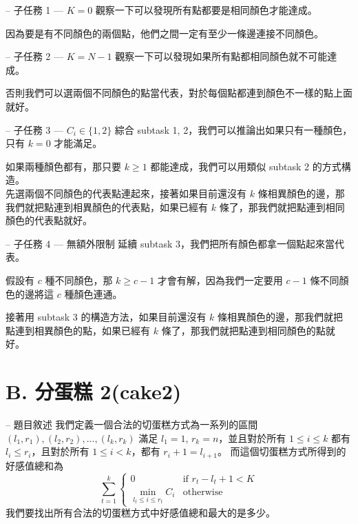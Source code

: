 \documentclass[hyperref,UTF8,notheorems,xcolor={dvipsnames}]{beamer}
\newcommand{\btitle}[1]{{\secname} -- #1}
\theoremstyle{definition}
\begin{document}
\begin{frame}[fragile]{\btitle{子任務 1 --- $K = 0$}}
	觀察一下可以發現所有點都要是相同顏色才能達成。 
	\pause

	因為要是有不同顏色的兩個點，他們之間一定有至少一條邊連接不同顏色。
\end{frame}

\begin{frame}[fragile]{\btitle{子任務 2 --- $K = N - 1$}}
	觀察一下可以發現如果所有點都相同顏色就不可能達成。 
	\pause

	否則我們可以選兩個不同顏色的點當代表，對於每個點都連到顏色不一樣的點上面就好。
\end{frame}

\begin{frame}[fragile]{\btitle{子任務 3 --- $C_i \in \{1, 2\}$}}
	綜合 subtask 1, 2，我們可以推論出如果只有一種顏色，只有 $k = 0$ 才能滿足。

	如果兩種顏色都有，那只要 $k \ge 1$ 都能達成，我們可以用類似 subtask 2 的方式構造。 \\
	先選兩個不同顏色的代表點連起來，接著如果目前還沒有 $k$ 條相異顏色的邊，那我們就把點連到相異顏色的代表點，如果已經有 $k$ 條了，那我們就把點連到相同顏色的代表點就好。
\end{frame}

\begin{frame}[fragile]{\btitle{子任務 4 --- 無額外限制}}
	延續 subtask 3，我們把所有顏色都拿一個點起來當代表。 

	假設有 $c$ 種不同顏色，那 $k \ge c - 1$ 才會有解，因為我們一定要用 $c - 1$ 條不同顏色的邊將這 $c$ 種顏色連通。
	\pause

	接著用 subtask 3 的構造方法，如果目前還沒有 $k$ 條相異顏色的邊，那我們就把點連到相異顏色的點，如果已經有 $k$ 條了，那我們就把點連到相同顏色的點就好。
\end{frame}

\section{B. 分蛋糕 2(cake2)}

\begin{frame}[fragile]{\btitle{題目敘述}}
	我們定義一個合法的切蛋糕方式為一系列的區間 $(l_1, r_1), (l_2, r_2), ..., (l_k, r_k)$ 滿足 $l_1 = 1$, $r_k = n$，並且對於所有 $1 \le i \le k$ 都有 $l_i \le r_i$，且對於所有 $1 \le i < k$，都有 $r_i + 1 =  l_{i + 1}$。
	而這個切蛋糕方式所得到的好感值總和為 
	$$
	\sum_{t = 1}^{k}{\begin{cases}
	0 & \text{if  } r_t - l_t + 1 < K \\
	\min_{l_t \le i \le r_t} C_i & \text{otherwise  }
	\end{cases}}
	$$
	我們要找出所有合法的切蛋糕方式中好感值總和最大的是多少。
\end{frame}
\end{document}
